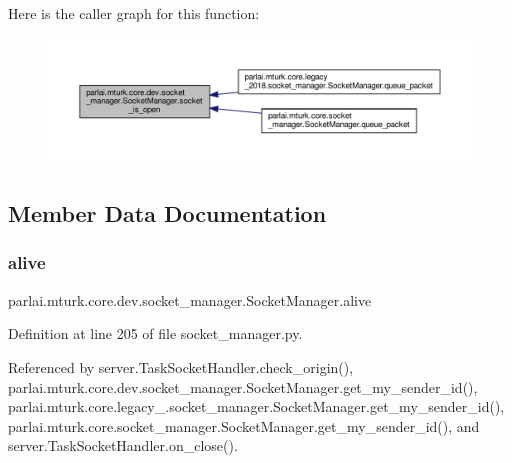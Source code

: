 Here is the caller graph for this function\+:
\nopagebreak
\begin{figure}[H]
\begin{center}
\leavevmode
\includegraphics[width=350pt]{classparlai_1_1mturk_1_1core_1_1dev_1_1socket__manager_1_1SocketManager_a2f0680695682a1bf6824efe6626d9dc6_icgraph}
\end{center}
\end{figure}


\subsection{Member Data Documentation}
\mbox{\label{classparlai_1_1mturk_1_1core_1_1dev_1_1socket__manager_1_1SocketManager_a853eb0d94f86024bb140644e0a003946}} 
\subsubsection{\texorpdfstring{alive}{alive}}
{\footnotesize\ttfamily parlai.\+mturk.\+core.\+dev.\+socket\+\_\+manager.\+Socket\+Manager.\+alive}



Definition at line 205 of file socket\+\_\+manager.\+py.



Referenced by server.\+Task\+Socket\+Handler.\+check\+\_\+origin(), parlai.\+mturk.\+core.\+dev.\+socket\+\_\+manager.\+Socket\+Manager.\+get\+\_\+my\+\_\+sender\+\_\+id(), parlai.\+mturk.\+core.\+legacy\+\_.\+socket\+\_\+manager.\+Socket\+Manager.\+get\+\_\+my\+\_\+sender\+\_\+id(), parlai.\+mturk.\+core.\+socket\+\_\+manager.\+Socket\+Manager.\+get\+\_\+my\+\_\+sender\+\_\+id(), and server.\+Task\+Socket\+Handler.\+on\+\_\+close().

